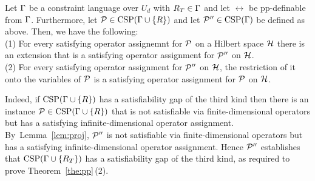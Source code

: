 \documentclass[11pt,letter]{article}
\begin{document}
\begin{lemma}\label{lem:proj}
  Let $\Gamma$ be a constraint language over $U_d$ with $R_T\in\Gamma$ and let $\rel$ be pp-definable
  from $\Gamma$. Furthermore, let ${\mathcal P}\in{\rm CSP}(\Gamma\cup\{R\})$ and let
  ${\mathcal P}''\in{\rm CSP}(\Gamma)$ be defined as above.  Then, we have the following:\\[2mm]
(1) For every satisfying operator assignemnt for ${\mathcal P}$ on a Hilbert
  space ${\mathcal H}$ there is an extension that is a satisfying operator
  assignment for ${\mathcal P}''$ on ${\mathcal H}$.\\[2mm]
(2) For every satisfying operator assignment for ${\mathcal P}''$ on ${\mathcal H}$, the
  restriction of it onto the variables of ${\mathcal P}$ is a satisfying operator
  assignment for ${\mathcal P}$ on ${\mathcal H}$.
\end{lemma}
Indeed, if ${\rm CSP}(\Gamma\cup\{R\})$ has a satisfiability gap of the
third kind then there is an instance ${\mathcal P}\in{\rm CSP}(\Gamma\cup\{R\})$ that is not
satisfiable via finite-dimensional operators but has a satisfying
infinite-dimensional operator assignment. By~Lemma~\ref{lem:proj}, ${\mathcal P}''$ is
not satisfiable via finite-dimensional operators but has a satisfying
infinite-dimensional operator assignment. Hence ${\mathcal P}''$ establishes that
${\rm CSP}(\Gamma\cup\{R_T\})$ has a satisfiability gap of the third kind, as required to prove Theorem~\ref{the:pp}\,(2).
\end{document}
